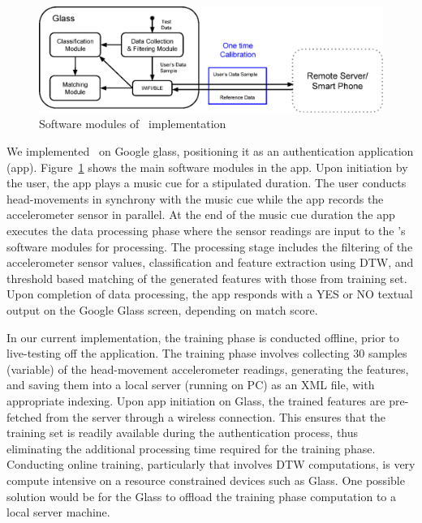 \begin{figure}[t]
\centering
\includegraphics [width=\columnwidth]{figure/software_arch.eps}
\caption{Software modules of \systemname~implementation}
\vspace{25 pt}
\label{fig:glass-softwarearch}
\end{figure}

We implemented \systemname~on Google glass, positioning it as an
authentication application (app).
Figure~\ref{fig:glass-softwarearch} shows the main software modules in the
app. Upon initiation by the user, the app plays a music cue for a stipulated
duration. The user conducts head-movements in synchrony with the music cue
while the app records the accelerometer sensor in parallel. At the end of the
music cue duration the app executes the data processing phase where the
sensor readings are input to the \systemname's software modules for
processing. The processing stage includes the filtering of the accelerometer
sensor values, classification and feature extraction using DTW, and threshold
based matching of the generated features with those from training set.
Upon completion of data processing, the app responds with a YES or NO textual
output on the Google Glass screen, depending on match score.

In our current implementation, the training phase is conducted offline, prior
to live-testing off the application.
The training phase involves collecting 30 samples (variable) of the
head-movement accelerometer readings, generating the features, and saving them
into a local server (running on PC) as an XML file, with appropriate indexing.
Upon app initiation on Glass, the trained features are pre-fetched from
the server through a wireless connection. This ensures that the training set
is readily available during the authentication process, thus eliminating the
additional processing time required for the training phase.
Conducting online training, particularly that involves DTW computations, is
very compute intensive on a resource constrained devices such as Glass.
One possible solution would be for the Glass to offload the
training phase computation to a local server machine.

